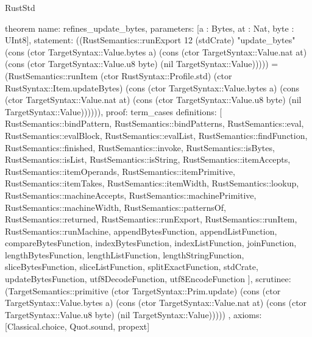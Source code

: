 \begin{lexlean}{RustStd}
\begin{semanticmodule}
theorem{
  name: refines_update_bytes,
  parameters: [a : Bytes, at : Nat, byte : UInt8],
  statement: ((RustSemantics::runExport 12 (stdCrate) "update_bytes" (cons (ctor TargetSyntax::Value.bytes a) (cons (ctor TargetSyntax::Value.nat at) (cons (ctor TargetSyntax::Value.u8 byte) (nil TargetSyntax::Value))))) = (RustSemantics::runItem (ctor RustSyntax::Profile.std) (ctor RustSyntax::Item.updateBytes) (cons (ctor TargetSyntax::Value.bytes a) (cons (ctor TargetSyntax::Value.nat at) (cons (ctor TargetSyntax::Value.u8 byte) (nil TargetSyntax::Value)))))),
  proof: term_cases{
    definitions: [
      RustSemantics::bindPattern,
      RustSemantics::bindPatterns,
      RustSemantics::eval,
      RustSemantics::evalBlock,
      RustSemantics::evalList,
      RustSemantics::findFunction,
      RustSemantics::finished,
      RustSemantics::invoke,
      RustSemantics::isBytes,
      RustSemantics::isList,
      RustSemantics::isString,
      RustSemantics::itemAccepts,
      RustSemantics::itemOperands,
      RustSemantics::itemPrimitive,
      RustSemantics::itemTakes,
      RustSemantics::itemWidth,
      RustSemantics::lookup,
      RustSemantics::machineAccepts,
      RustSemantics::machinePrimitive,
      RustSemantics::machineWidth,
      RustSemantics::patternsOf,
      RustSemantics::returned,
      RustSemantics::runExport,
      RustSemantics::runItem,
      RustSemantics::runMachine,
      appendBytesFunction,
      appendListFunction,
      compareBytesFunction,
      indexBytesFunction,
      indexListFunction,
      joinFunction,
      lengthBytesFunction,
      lengthListFunction,
      lengthStringFunction,
      sliceBytesFunction,
      sliceListFunction,
      splitExactFunction,
      stdCrate,
      updateBytesFunction,
      utf8DecodeFunction,
      utf8EncodeFunction
    ],
    scrutinee: (TargetSemantics::primitive (ctor TargetSyntax::Prim.update) (cons (ctor TargetSyntax::Value.bytes a) (cons (ctor TargetSyntax::Value.nat at) (cons (ctor TargetSyntax::Value.u8 byte) (nil TargetSyntax::Value)))))
  },
  axioms: [Classical.choice, Quot.sound, propext]
}
\end{semanticmodule}
\end{lexlean}
